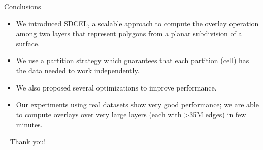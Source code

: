 \documentclass{beamer}
\begin{document}
    \begin{frame}{Conclusions}
        \begin{itemize}
            \item We introduced SDCEL, a scalable approach to compute the overlay operation among two layers that represent polygons from a planar subdivision of a surface.
            \item We use a partition strategy which guarantees that each partition (cell) has the data needed to work independently.
            \item We also proposed several optimizations to improve performance.
            \item Our experiments using real datasets show very good performance; we are able to compute overlays over very large layers (each with >35M edges) in few minutes.
        \end{itemize}
    \end{frame}    

    \begin{frame}{ \ }
        \LARGE Thank you!
    \end{frame}
\end{document}
